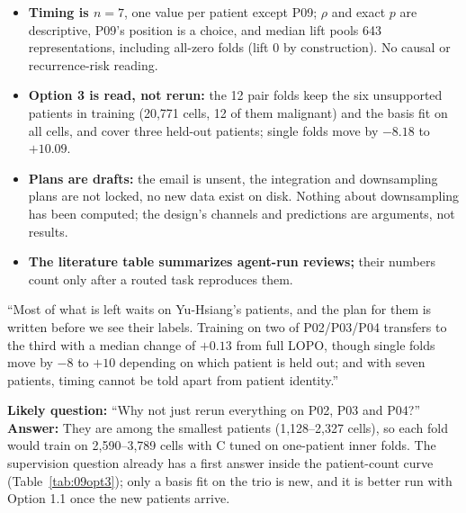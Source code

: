 \begin{caveatbox}
\begin{itemize}
\item \textbf{Timing is $n = 7$}, one value per patient except P09; $\rho$ and exact $p$ are descriptive, P09's position is a choice, and median lift pools 643 representations, including all-zero folds (lift 0 by construction). No causal or recurrence-risk reading.
\item \textbf{Option 3 is read, not rerun:} the 12 pair folds keep the six unsupported patients in training (20,771 cells, 12 of them malignant) and the basis fit on all cells, and cover three held-out patients; single folds move by $-8.18$ to $+10.09$\pp.
\item \textbf{Plans are drafts:} the email is unsent, the integration and downsampling plans are not locked, no new data exist on disk. Nothing about downsampling has been computed; the design's channels and predictions are arguments, not results.
\item \textbf{The literature table summarizes agent-run reviews;} their numbers count only after a routed task reproduces them.
\end{itemize}
\end{caveatbox}

\begin{teambox}
``Most of what is left waits on Yu-Hsiang's patients, and the plan for them is written before we see their labels. Training on two of P02/P03/P04 transfers to the third with a median change of $+0.13$\pp{} from full LOPO, though single folds move by $-8$ to $+10$\pp{} depending on which patient is held out; and with seven patients, timing cannot be told apart from patient identity.''

\textbf{Likely question:} ``Why not just rerun everything on P02, P03 and P04?''\\
\textbf{Answer:} They are among the smallest patients (1,128--2,327 cells), so each fold would train on 2,590--3,789 cells with C tuned on one-patient inner folds. The supervision question already has a first answer inside the patient-count curve (Table~\ref{tab:09opt3}); only a basis fit on the trio is new, and it is better run with Option 1.1 once the new patients arrive.
\end{teambox}

